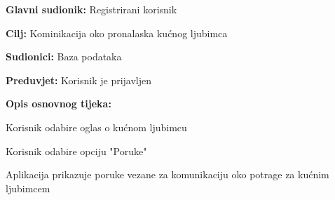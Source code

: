 \noindent {}
\begin{packed_item}
	
	\item \textbf{Glavni sudionik: }Registrirani korisnik
	\item  \textbf{Cilj:} Kominikacija oko pronalaska kućnog ljubimca
	\item  \textbf{Sudionici:} Baza podataka
	\item  \textbf{Preduvjet:} Korisnik je prijavljen
	\item  \textbf{Opis osnovnog tijeka:}
	
	\item[] \begin{packed_enum}
		
		\item Korisnik odabire oglas o kućnom ljubimcu
		\item Korisnik odabire opciju "Poruke"
		\item Aplikacija prikazuje poruke vezane za komunikaciju oko potrage za kućnim ljubimcem

	\end{packed_enum}
	

\end{packed_item}

